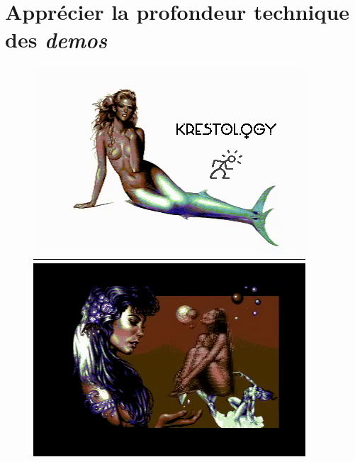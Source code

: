 \section{Apprécier la profondeur technique des \textit{demos}}
\begin{figure}[h]
  \begin{minipage}[b]{0.30\linewidth}
    \centering
    \includegraphics[width=\linewidth]{images/demoscene/demos/kresto1.png}
  \end{minipage}
  \hfill
  \begin{minipage}[b]{0.30\linewidth}
    \centering
    \includegraphics[width=\linewidth]{images/demoscene/demos/kresto2.png}
  \end{minipage}
  \hfill
  \begin{minipage}[b]{0.30\linewidth}
    \centering

\end{minipage}
\end{figure}

